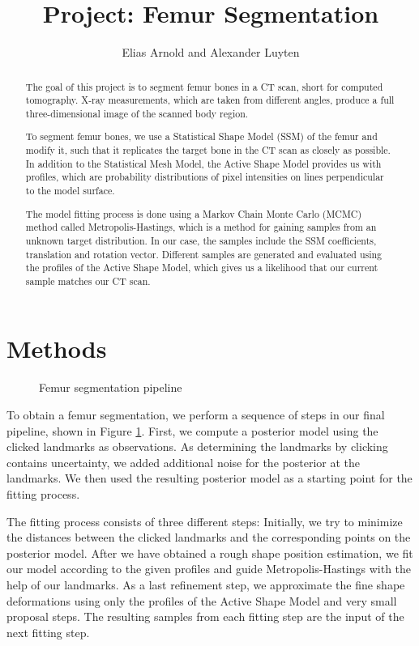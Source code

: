 \documentclass{IEEEtran}
\author{Elias Arnold and Alexander Luyten}
\title{Project: Femur Segmentation}
\begin{document}
\maketitle
\begin{abstract}
The goal of this project is to segment femur bones in a CT scan, short for computed tomography. X-ray measurements, which are taken from different angles, produce a full three-dimensional image of the scanned body region.\par
To segment femur bones, we use a Statistical Shape Model (SSM) of the femur and modify it, such that it replicates the target bone in the CT scan as closely as possible. In addition to the Statistical Mesh Model, the Active Shape Model provides us with profiles, which are probability distributions of pixel intensities on lines perpendicular to the model surface.\par
The model fitting process is done using a Markov Chain Monte Carlo (MCMC) method called Metropolis-Hastings, which is a method for gaining samples from an unknown target distribution. In our case, the samples include the SSM coefficients, translation and rotation vector. Different samples are generated and evaluated using the profiles of the Active Shape Model, which gives us a likelihood that our current sample matches our CT scan.
\end{abstract}

\section{Methods}
	\begin{figure}
		\scalebox{.66}{}
		\caption{Femur segmentation pipeline}
		\label{fig:pipeline}
	\end{figure}
To obtain a femur segmentation, we perform a sequence of steps in our final pipeline, shown in Figure \ref{fig:pipeline}. First, we compute a posterior model using the clicked landmarks as observations. As determining the landmarks by clicking contains uncertainty, we added additional noise for the posterior at the landmarks. We then used the resulting posterior model as a starting point for the fitting process.\par
The fitting process consists of three different steps: Initially, we try to minimize the distances between the clicked landmarks and the corresponding points on the posterior model. After we have obtained a rough shape position estimation, we fit our model according to the given profiles and guide Metropolis-Hastings with the help of our landmarks. As a last refinement step, we approximate the fine shape deformations using only the profiles of the Active Shape Model and very small proposal steps. The resulting samples from each fitting step are the input of the next fitting step.
\end{document}
